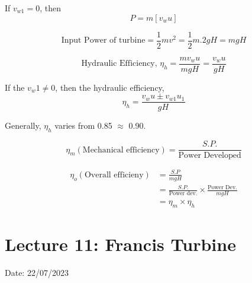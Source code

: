 \documentclass{article}
\begin{document}
\begin{multicols*}{2}
If $v_{w1} = 0$, then 
\begin{equation}
  P = m \left[v_w u\right] \label{eq:eq49}
\end{equation}

\begin{equation}
  \text{Input Power of turbine} = \frac{1}{2} m v^2 = \frac{1}{2} m . 2gH = mgH \label{eq:eq50}
\end{equation}

\begin{equation}
  \text{Hydraulic Efficiency, }\eta_h = \frac{m v_w u}{m g H} = \frac{v_w u}{g H} \label{eq:eq51}
\end{equation}

If the $v_w1 \neq 0$, then the hydraulic efficiency,
\begin{equation}
  \eta_h = \frac{v_w u \pm v_{w1} u_1}{g H} \label{eq:eq52}
\end{equation}

Generally, $\eta_h$ varies from 0.85 $\approx$ 0.90.

$$\eta_m (\text{Mechanical efficiency}) = \frac{S.P.}{\text{Power Developed}}$$

\begin{align*}
  \eta_o (\text{Overall efficieny}) &= \frac{S.P}{mgH} \\
  &= \frac{S.P.}{\text{Power dev.}} \times \frac{\text{Power Dev.}}{mgH} \\
  &= \eta_m \times \eta_h
\end{align*}
\end{multicols*}


\section{Lecture 11: Francis Turbine}
\hfill Date: 22/07/2023
\end{document}
